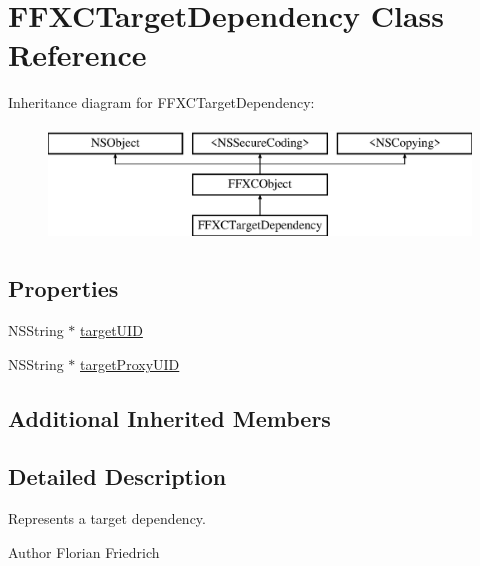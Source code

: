 \hypertarget{interface_f_f_x_c_target_dependency}{\section{F\-F\-X\-C\-Target\-Dependency Class Reference}
\label{interface_f_f_x_c_target_dependency}
}
Inheritance diagram for F\-F\-X\-C\-Target\-Dependency\-:\begin{figure}[H]
\begin{center}
\leavevmode
\includegraphics[height=3.000000cm]{interface_f_f_x_c_target_dependency}
\end{center}
\end{figure}
\subsection*{Properties}
\begin{DoxyCompactItemize}
\item 
N\-S\-String $\ast$ \hyperlink{interface_f_f_x_c_target_dependency_a96bf590ddc42a06e6664800e32a9ff05}{target\-U\-I\-D}
\item 
N\-S\-String $\ast$ \hyperlink{interface_f_f_x_c_target_dependency_a59997ab5494a7d486b1d646658360208}{target\-Proxy\-U\-I\-D}
\end{DoxyCompactItemize}
\subsection*{Additional Inherited Members}


\subsection{Detailed Description}
Represents a target dependency. \begin{DoxyAuthor}{Author}
Florian Friedrich 
\end{DoxyAuthor}


